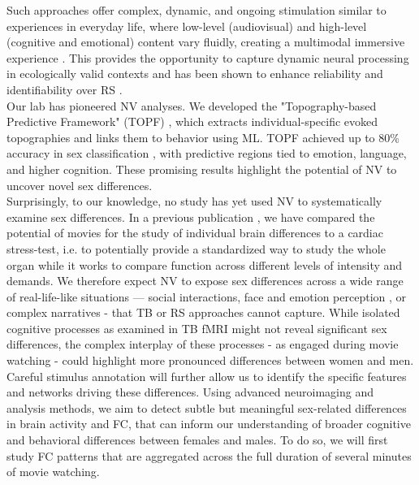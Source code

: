\documentclass[11pt,a4paper]{article}
\begin{document}
Such approaches offer complex, dynamic, and ongoing stimulation similar to experiences in everyday life, 
where low-level (audiovisual) and high-level (cognitive and emotional) content vary fluidly, 
creating a multimodal immersive experience \parencite{sonkusareNaturalisticStimuliNeuroscience2019}. 
This provides the opportunity to capture dynamic neural processing in ecologically valid contexts 
\parencite{vanderwalMoviesMagnetNaturalistic2019} and has been shown to enhance reliability and identifiability 
over RS \parencite{krollNaturalisticViewingIncreases2023}.\\
Our lab has pioneered NV analyses. We developed the "Topography-based Predictive Framework" (TOPF) 
\parencite{liTopographybasedPredictiveFramework2023a}, which extracts individual-specific evoked 
topographies and links them to behavior using ML.
TOPF achieved up to 80\% accuracy in sex classification \parencite{liStimulusSelectionInfluences2025a}, 
with predictive regions tied to emotion, language, and higher cognition. 
These promising results highlight the potential of NV to uncover novel sex differences.\\
Surprisingly, to our knowledge, no study has yet used NV to systematically examine sex differences. 
In a previous publication \parencite{eickhoffClinicalApplicationsMovie2020a}, we have compared the potential of 
movies for the study of individual brain differences to a cardiac stress-test, 
i.e. to potentially provide a standardized way to study the whole organ while it works to compare function 
across different levels of intensity and demands. 
We therefore expect NV to expose sex differences across a wide range of real-life-like situations — social interactions, 
face and emotion perception \parencite{sonkusareNaturalisticStimuliNeuroscience2019}, 
or complex narratives - that TB or RS approaches cannot capture. 
While isolated cognitive processes as examined in TB fMRI might not reveal 
significant sex differences, the complex interplay of these processes - as engaged during movie watching - could 
highlight more pronounced differences between women and men. 
Careful stimulus annotation will further allow us to identify the specific features and networks driving these differences.
Using advanced neuroimaging and analysis methods, we aim to detect subtle but meaningful sex-related differences 
in brain activity and FC, that can inform our understanding of 
broader cognitive and behavioral differences between females and males.
To do so, we will first study FC patterns that are aggregated across the full duration of several minutes of movie watching. 
\end{document}
